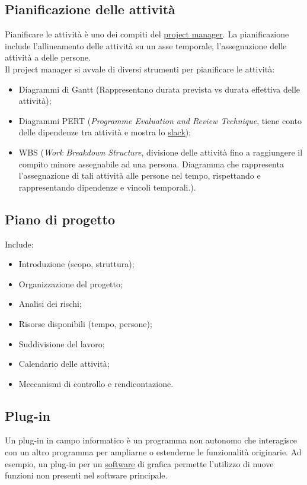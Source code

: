 
	\subsection{Pianificazione delle attività}
	\label{sec:pianificazioneattivita}
	Pianificare le attività è uno dei compiti del \underline{\hyperref[sec:projectmanager]{project manager}}.
	La pianificazione include l'allineamento delle attività su un asse temporale, l'assegnazione delle attività a delle persone. \\Il project manager si avvale di diversi strumenti per pianificare le attività:
	\begin{itemize}
	\item Diagrammi di Gantt (Rappresentano durata prevista vs durata effettiva delle attività);
	\item Diagrammi PERT (\emph{Programme Evaluation and Review Technique}, tiene conto delle dipendenze tra attività e mostra lo \hyperref[sec:slack]{slack});
	\item WBS (\emph{Work Breakdown Structure}, divisione delle attività fino a raggiungere il compito minore assegnabile ad una persona. Diagramma che rappresenta l'assegnazione di tali attività alle persone nel tempo, rispettando e rappresentando dipendenze e vincoli temporali.).
	\end{itemize}


	\subsection{Piano di progetto}
	\label{sec:pianoprogetto}
	Include:
	\begin{itemize}
	\item Introduzione (scopo, struttura);
	\item Organizzazione del progetto;
	\item Analisi dei rischi;
	\item Risorse disponibili (tempo, persone);
	\item Suddivisione del lavoro;
	\item Calendario delle attività;
	\item Meccanismi di controllo e rendicontazione.
	\end{itemize}

	\subsection{Plug-in}
	\label{sec:plug-in}
	Un plug-in in campo informatico è un programma non autonomo che interagisce con un altro programma per ampliarne o estenderne le funzionalità originarie. Ad esempio, un plug-in per un \underline{\hyperref[sec:prodottosoftware]{software}} di grafica permette l'utilizzo di nuove funzioni non presenti nel software principale.

